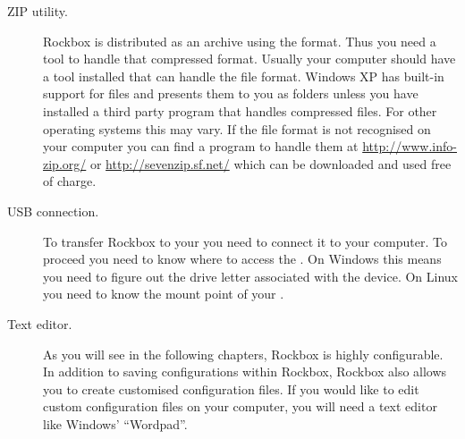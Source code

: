 \begin{description}

\item[ZIP utility.]
  Rockbox is distributed as an archive using the
   format. Thus you need a tool to handle that compressed
  format. Usually your computer should have a tool installed that can
  handle the  file format. Windows XP has built-in support for
   files and presents them to you as folders unless you have
  installed a third party program that handles compressed files. For
  other operating systems this may vary. If the  file format
  is not recognised on your computer you can find a program to handle them
  at \url{http://www.info-zip.org/} or \url{http://sevenzip.sf.net/} which
  can be downloaded and used free of charge.

\item[USB connection.] To transfer Rockbox to your \dap{} you need to
  connect it to your computer. To proceed you need to know where to access the
  \dap{}. On Windows this means you need to figure out the drive letter
  associated with the device. On Linux you need to know the mount point of
  your \dap{}.



\item[Text editor.] As you will see in the following chapters, Rockbox is
  highly configurable. In addition to saving configurations within Rockbox,
  Rockbox also allows you to create customised configuration files. If you
  would like to edit custom configuration files on your computer, you will
  need a text editor like Windows' ``Wordpad''.

\end{description}

